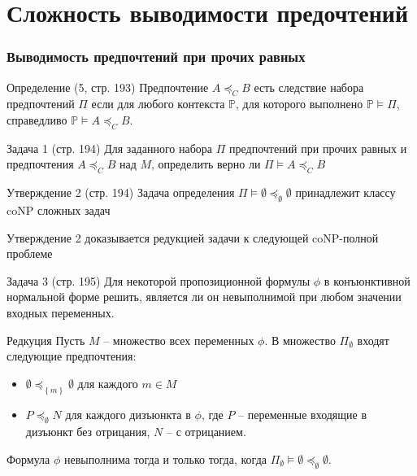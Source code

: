 \documentclass{beamer}
\newcommand{\obj}[1]{\left\{ #1 \right \}}
\begin{document}

\section{Сложность выводимости предочтений } %
\label{sec:complexity_issues}

\begin{frame}\frametitle{Выводимость предпочтений при прочих равных}
  \begin{block}{Определение (5, стр. 193)}
    Предпочтение $A\preceq_C B$ есть следствие набора предпочтений $\Pi$ если для любого контекста $\mathbb{P}$, для которого выполнено $\mathbb{P}\models \Pi$, справедливо $\mathbb{P}\models A\preceq_C B$.
  \end{block}
  \begin{block}{Задача 1 (стр. 194)}
    Для заданного набора $\Pi$ предпочтений при прочих равных и предпочтения $A\preceq_C B$ над $M$, определить верно ли $\Pi \models A\preceq_C B$
  \end{block}
  \begin{block}{Утверждение 2 (стр. 194)}
    Задача определения $\Pi \models \emptyset\preceq_\emptyset \emptyset$ принадлежит классу coNP сложных задач
  \end{block}
\end{frame}


\begin{frame}
  Утверждение 2 доказывается редукцией задачи к следующей coNP-полной проблеме
  \begin{block}{Задача 3 (стр. 195)}
    Для некоторой пропозиционной формулы $\phi$ в конъюнктивной нормальной форме решить, является ли он невыполнимой при любом значении входных переменных.
  \end{block}
  \begin{block}{Редкуция}
    Пусть $M$ -- множество всех переменных $\phi$. В множество $\Pi_\emptyset$ входят следующие предпочтения:
    \begin{itemize}
      \item $\emptyset \preceq_{\obj{m}} \emptyset$ для каждого $m\in M$
      \item $P \preceq_\emptyset N$ для каждого дизъюнкта в $\phi$, где $P$ -- переменные входящие в дизъюнкт без отрицания, $N$ -- с отрицанием.
    \end{itemize}
    Формула $\phi$ невыполнима тогда и только тогда, когда $\Pi_\emptyset\models \emptyset \preceq_\emptyset \emptyset$.
  \end{block}
\end{frame}
\end{document}
